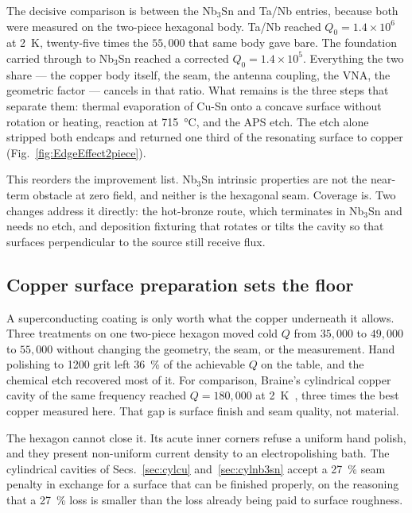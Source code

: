 The decisive comparison is between the Nb$_3$Sn and Ta/Nb entries, because both were measured on the two-piece hexagonal body. Ta/Nb reached $Q_0 = 1.4\times10^{6}$ at \qty{2}{\kelvin}, twenty-five times the $55{,}000$ that same body gave bare. The foundation carried through to Nb$_3$Sn reached a corrected $Q_0 = 1.4\times10^{5}$. Everything the two share --- the copper body itself, the seam, the antenna coupling, the VNA, the geometric factor --- cancels in that ratio. What remains is the three steps that separate them: thermal evaporation of Cu-Sn onto a concave surface without rotation or heating, reaction at \qty{715}{\degreeCelsius}, and the APS etch. The etch alone stripped both endcaps and returned one third of the resonating surface to copper (Fig.~\ref{fig:EdgeEffect2piece}).

This reorders the improvement list. Nb$_3$Sn intrinsic properties are not the near-term obstacle at zero field, and neither is the hexagonal seam. Coverage is. Two changes address it directly: the hot-bronze route, which terminates in Nb$_3$Sn and needs no etch, and deposition fixturing that rotates or tilts the cavity so that surfaces perpendicular to the source still receive flux.

\subsection{Copper surface preparation sets the floor}

A superconducting coating is only worth what the copper underneath it allows. Three treatments on one two-piece hexagon moved cold $Q$ from $35{,}000$ to $49{,}000$ to $55{,}000$ without changing the geometry, the seam, or the measurement. Hand polishing to 1200 grit left \qty{36}{\percent} of the achievable $Q$ on the table, and the chemical etch recovered most of it. For comparison, Braine's cylindrical copper cavity of the same frequency reached $Q = 180{,}000$ at \qty{2}{\kelvin}~\cite{Braine:2024nzi}, three times the best copper measured here. That gap is surface finish and seam quality, not material.

The hexagon cannot close it. Its acute inner corners refuse a uniform hand polish, and they present non-uniform current density to an electropolishing bath. The cylindrical cavities of Secs.~\ref{sec:cylcu} and~\ref{sec:cylnb3sn} accept a \qty{27}{\percent} seam penalty in exchange for a surface that can be finished properly, on the reasoning that a \qty{27}{\percent} loss is smaller than the loss already being paid to surface roughness.

